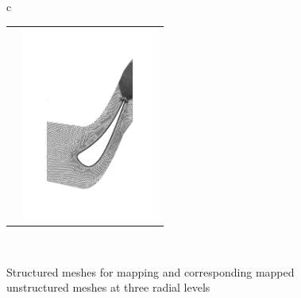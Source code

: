 \begin{figure}
\begin{center}
\begin{tabular}{c}
{\begin{tabular}{cc}
      &
      {\hspace{10mm}\includegraphics[width=45mm,clip=t]{CHAP_MESH/FIGURE/mesh2d_2_unstruct.pdf}}
      \end{tabular}}
    \\
  \end{tabular}
 \end{center}
 \vspace{-5mm}
 \caption{Structured meshes for mapping and corresponding mapped unstructured meshes at three radial levels}
 \label{mesh2d_other.fig}
\end{figure}
